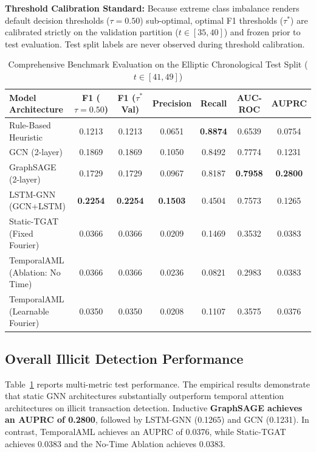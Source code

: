 \documentclass[conference]{IEEEtran}
\begin{document}
\textbf{Threshold Calibration Standard:} Because extreme class imbalance renders default decision thresholds ($\tau = 0.50$) sub-optimal, optimal F1 thresholds ($\tau^*$) are calibrated strictly on the validation partition ($t \in [35, 40]$) and frozen prior to test evaluation. Test split labels are never observed during threshold calibration.

\begin{table}[!t]
\centering
\caption{Comprehensive Benchmark Evaluation on the Elliptic Chronological Test Split ($t \in [41, 49]$)}
\label{tab:benchmark_results}
\begin{tabular}{lcccccc}
\toprule
\textbf{Model Architecture} & \textbf{F1 ($\tau=0.50$)} & \textbf{F1 ($\tau^*$ Val)} & \textbf{Precision} & \textbf{Recall} & \textbf{AUC-ROC} & \textbf{AUPRC} \\
\midrule
Rule-Based Heuristic & 0.1213 & 0.1213 & 0.0651 & \textbf{0.8874} & 0.6539 & 0.0754 \\
GCN (2-layer) & 0.1869 & 0.1869 & 0.1050 & 0.8492 & 0.7774 & 0.1231 \\
GraphSAGE (2-layer) & 0.1729 & 0.1729 & 0.0967 & 0.8187 & \textbf{0.7958} & \textbf{0.2800} \\
LSTM-GNN (GCN+LSTM) & \textbf{0.2254} & \textbf{0.2254} & \textbf{0.1503} & 0.4504 & 0.7573 & 0.1265 \\
Static-TGAT (Fixed Fourier) & 0.0366 & 0.0366 & 0.0209 & 0.1469 & 0.3532 & 0.0383 \\
TemporalAML (Ablation: No Time) & 0.0366 & 0.0366 & 0.0236 & 0.0821 & 0.2983 & 0.0383 \\
TemporalAML (Learnable Fourier) & 0.0350 & 0.0350 & 0.0208 & 0.1107 & 0.3575 & 0.0376 \\
\bottomrule
\end{tabular}
\end{table}

\subsection{Overall Illicit Detection Performance}
Table~\ref{tab:benchmark_results} reports multi-metric test performance. The empirical results demonstrate that static GNN architectures substantially outperform temporal attention architectures on illicit transaction detection. Inductive \textbf{GraphSAGE achieves an AUPRC of 0.2800}, followed by LSTM-GNN (0.1265) and GCN (0.1231). In contrast, TemporalAML achieves an AUPRC of 0.0376, while Static-TGAT achieves 0.0383 and the No-Time Ablation achieves 0.0383.
\end{document}

